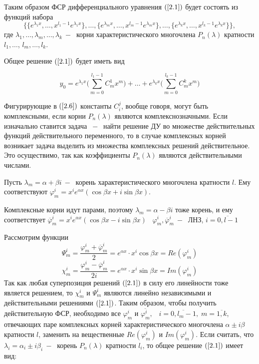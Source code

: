 Таким образом ФСР дифференциального уравнения $(\ref{2.1})$ будет состоять из функций набора
$$ \Bigg\{\{e^{\lambda_1 x}, \dots , x^{l_1-1}e^{\lambda_1 x}\}, \dots, \{e^{\lambda_mx}, \dots, x^{l_m-1 }e^{\lambda_mx}\}, \dots, \{e^{\lambda_k x}, \dots, x^{l_k-1}e^{\lambda_k x}\}\Bigg\},$$
где $\lambda_1, \dots, \lambda_m, \dots, \lambda_k~-~$ корни характеристического многочлена $P_n(\lambda)$ кратности $l_1, \dots$, $l_m, \dots, l_k$.\par
Общее решение $(\ref{2.1})$ будет иметь вид

\begin{equation}
    \tag{2.6}
    \label{2.6}
    y_0=e^{\lambda_1x}\Big(\displaystyle\sum_{m=0}^{l_1-1}C_m^1x^m\Big)+\dots+e^{\lambda_kx}\Big(\displaystyle\sum_{m=0}^{l_k-1}C_m^kx^m\Big)
\end{equation}

Фигурирующие в $(\ref{2.6})$ константы $C_i^j$, вообще говоря, могут быть комплексными, если корни $P_n(\lambda)$ являются комплекснозначными. Если изначально ставится задача $~-~$ найти решение ДУ во множестве действительных функций действительного переменного, то в случае комплексных корней возникает задача выделить из множества комплексных решений действительное. Это осуществимо, так как коэффициенты $P_n(\lambda)$ являются действительными числами.\par
Пусть $\lambda_m=\alpha+\beta i ~-~$ корень характеристического многочлена кратности $l$. Ему соответствуют $\varphi_m^i=x^ie^{\alpha x}(\cos{\beta x}+i\sin{\beta x}) $.

Комплексные корни идут парами, поэтому $\lambda_m=\alpha-\beta i$ тоже корень, и ему соответствует 
$\overline{\varphi}_m^i=x^ie^{\alpha x}(\cos{\beta x}-i\sin{\beta x})\;\;\;\varphi^i_m, \overline{\varphi}_m^i~-~$ ЛНЗ, $i=\overline{0, l-1}$\par
Рассмотрим функции $$\Psi_m^i =\frac{\varphi_m^i+\overline{\varphi}_m^i}{2}=e^{\alpha x}\cdot x^i\cos{\beta x}= Re(\varphi^i_m)$$
$$\chi_m^i =\frac{\varphi_m^i-\overline{\varphi}_m^i}{2i}=e^{\alpha x}\cdot x^i\sin{\beta x}= Im(\varphi^i_m)$$
Так как любая суперпозиция решений $(\ref{2.1})$ в силу его линейности тоже является решением, то $\chi_m^i$ и $\Psi_m^i$ являются линейно независимыми и действительными решениями $(\ref{2.1})$. Таким образом, чтобы получить действительную ФСР, необходимо все $\varphi_m^i$ и $\overline{\varphi_m^i}, \;\;\; i=\overline{0, l_m-1}, \; m=\overline{1, k} $, отвечающих паре комплексных корней характеристического многочлена $\alpha \pm i\beta $ кратности $l$, заменить на вещественные $Re(\varphi_m^i)$ и $Im(\varphi_m^i)$. Если считать, что $\lambda_i=\alpha_i\pm i\beta_i~-~$ корень $P_n(\lambda)$ кратности $l_i$, то общее решение $(\ref{2.1})$ имеет вид:

